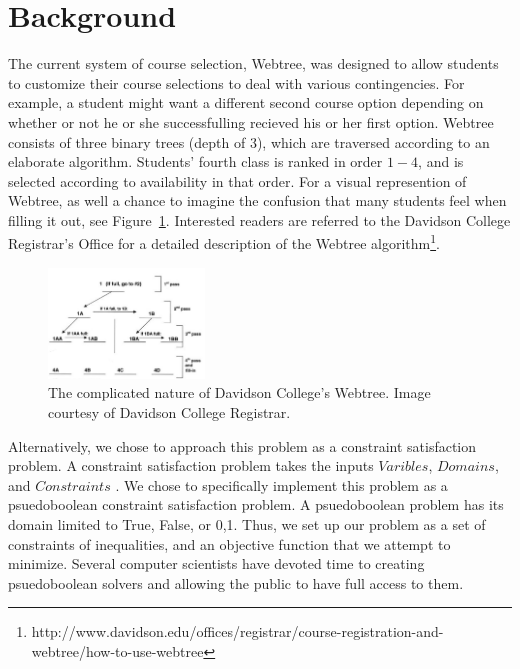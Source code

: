 
\section{Background}
\label{sec:background}

The current system of course selection, Webtree, was designed to allow
students to customize their course selections to deal with various
contingencies. For example, a student might want a different second
course option depending on whether or not he or she successfulling
recieved his or her first option. Webtree consists of three binary trees (depth
of $3$), which are traversed according to an elaborate
algorithm. Students' fourth class is ranked in order $1-4$, and is
selected according to availability in that order. For a visual
represention of Webtree, as well a chance to imagine the confusion that
many students feel when filling it out, see
Figure~\ref{fig:webtr}. Interested readers are referred to the
Davidson College Registrar's Office for a detailed description of the
Webtree algorithm\footnote{http://www.davidson.edu/offices/registrar/course-registration-and-webtree/how-to-use-webtree}.

\begin{figure}[htb]
  \centering  %
  \includegraphics[width=0.37\textwidth]{figs/webtree.jpg}
  \caption{The complicated nature of Davidson College's Webtree. Image
    courtesy of Davidson College Registrar.}
  \label{fig:webtr}
\end{figure}

Alternatively, we chose to approach this problem as a constraint
satisfaction problem. A constraint satisfaction problem takes the
inputs $Varibles$, $Domains$, and $Constraints$ \cite{aima}. We chose to
specifically implement this problem as a psuedoboolean constraint
satisfaction problem. A psuedoboolean problem has its domain limited
to {True, False}, or {0,1}. Thus, we set up our problem as a set of
constraints of inequalities, and an objective function that we attempt
to minimize. Several computer scientists have devoted time to creating
psuedoboolean solvers and allowing the public to have full access to
them.

